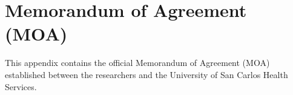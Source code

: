 
\chapter{Memorandum of Agreement (MOA)}
\label{appendix:moa}

This appendix contains the official Memorandum of Agreement (MOA) established between the researchers and the University of San Carlos Health Services.


